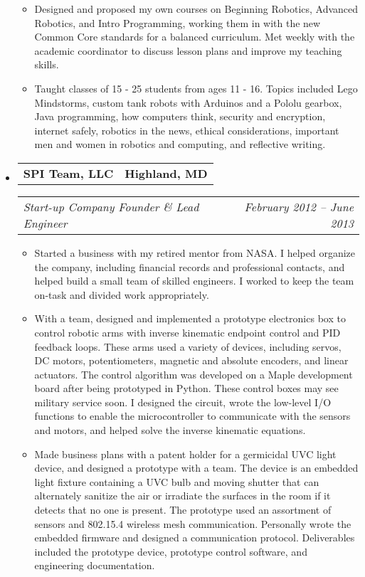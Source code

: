 \documentclass[10pt,letterpaper]{article}
\makeatletter
\newcommand{\headerrow}[2]
{\begin{tabular*}{\linewidth}{l@{\extracolsep{\fill}}r}
	#1 & #2 \\
\end{tabular*}}
\makeatother
\begin{document}
\begin{itemize}
\begin{itemize}
        \item Designed and proposed my own courses on Beginning Robotics,
            Advanced Robotics, and Intro Programming, working them in with the
            new Common Core standards for a balanced curriculum.  Met weekly
            with the academic coordinator to discuss lesson plans and improve
            my teaching skills.

        \item Taught classes of 15 - 25 students from ages 11 - 16.  Topics
            included Lego Mindstorms, custom tank robots with Arduinos and a
            Pololu gearbox, Java programming, how computers think, security and
            encryption, internet safely, robotics in the news, ethical
            considerations, important men and women in robotics and computing,
            and reflective writing.
	\end{itemize}

	\item
	\headerrow
		{\textbf{SPI Team, LLC}}
		{\textbf{Highland, MD}}
	\headerrow
		{\emph{Start-up Company Founder \& Lead Engineer}}
		{\emph{February 2012 -- June 2013}}
	\begin{itemize}
        \item Started a business with my retired mentor from NASA\@.  I helped
            organize the company, including financial records and professional
            contacts, and helped build a small team of skilled engineers.  I
            worked to keep the team on-task and divided work appropriately.

        \item With a team, designed and implemented a prototype electronics box
            to control robotic arms with inverse kinematic endpoint control and
            PID feedback loops.  These arms used a variety of devices,
            including servos, DC motors, potentiometers, magnetic and absolute
            encoders, and linear actuators.  The control algorithm was
            developed on a Maple development board after being prototyped in
            Python.  These control boxes may see military service soon.  I
            designed the circuit, wrote the low-level I/O functions to enable
            the microcontroller to communicate with the sensors and motors, and
            helped solve the inverse kinematic equations.

        \item Made business plans with a patent holder for a germicidal UVC
            light device, and designed a prototype with a team. The device is
            an embedded light fixture containing a UVC bulb and moving shutter
            that can alternately sanitize the air or irradiate the surfaces in
            the room if it detects that no one is present.  The prototype used
            an assortment of sensors and 802.15.4 wireless mesh communication.
            Personally wrote the embedded firmware and designed a communication
            protocol.  Deliverables included the prototype device, prototype
            control software, and engineering documentation.


\end{itemize}
\end{itemize}
\end{document}
